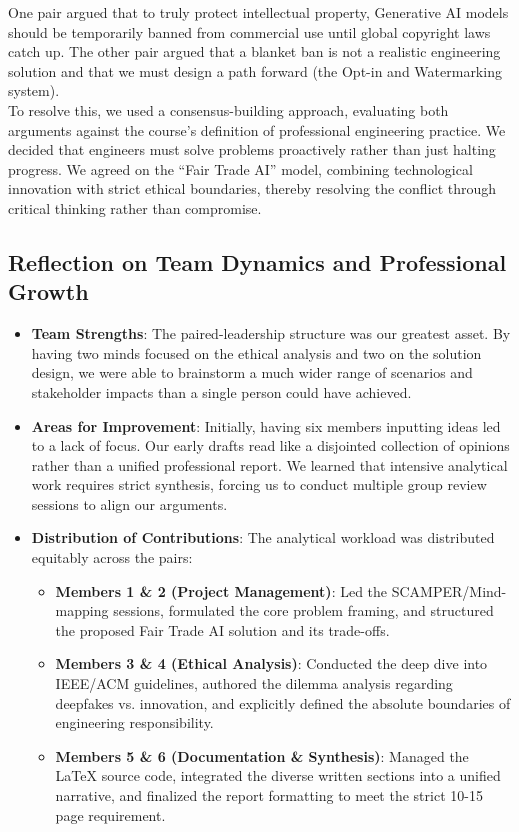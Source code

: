 One pair argued that to truly protect intellectual property, Generative AI models should be temporarily banned from commercial use until global copyright laws catch up. The other pair argued that a blanket ban is not a realistic engineering solution and that we must design a path forward (the Opt-in and Watermarking system). \\

To resolve this, we used a consensus-building approach, evaluating both arguments against the course's definition of professional engineering practice. We decided that engineers must solve problems proactively rather than just halting progress. We agreed on the ``Fair Trade AI'' model, combining technological innovation with strict ethical boundaries, thereby resolving the conflict through critical thinking rather than compromise.

\subsection{Reflection on Team Dynamics and Professional Growth}
\begin{itemize}
    \item \textbf{Team Strengths}: The paired-leadership structure was our greatest asset. By having two minds focused on the ethical analysis and two on the solution design, we were able to brainstorm a much wider range of scenarios and stakeholder impacts than a single person could have achieved. 
    \item \textbf{Areas for Improvement}: Initially, having six members inputting ideas led to a lack of focus. Our early drafts read like a disjointed collection of opinions rather than a unified professional report. We learned that intensive analytical work requires strict synthesis, forcing us to conduct multiple group review sessions to align our arguments.
    \item \textbf{Distribution of Contributions}: The analytical workload was distributed equitably across the pairs:
    \begin{itemize}
        \item \textbf{Members 1 \& 2 (Project Management)}: Led the SCAMPER/Mind-mapping sessions, formulated the core problem framing, and structured the proposed Fair Trade AI solution and its trade-offs.
        \item \textbf{Members 3 \& 4 (Ethical Analysis)}: Conducted the deep dive into IEEE/ACM guidelines, authored the dilemma analysis regarding deepfakes vs. innovation, and explicitly defined the absolute boundaries of engineering responsibility.
        \item \textbf{Members 5 \& 6 (Documentation \& Synthesis)}: Managed the LaTeX source code, integrated the diverse written sections into a unified narrative, and finalized the report formatting to meet the strict 10-15 page requirement.
    \end{itemize}
\end{itemize}